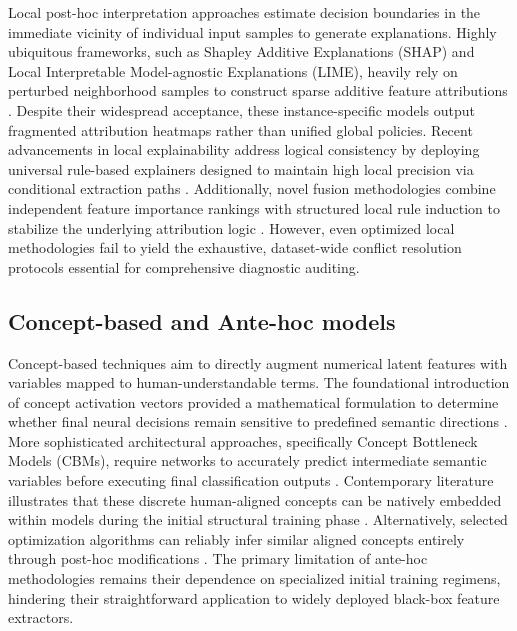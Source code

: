 \documentclass[make,article,submit,pdftex,moreauthors]{Definitions/mdpi}
\begin{document}
Local post-hoc interpretation approaches estimate decision boundaries in the immediate vicinity of individual input samples to generate explanations. Highly ubiquitous frameworks, such as Shapley Additive Explanations (SHAP) and Local Interpretable Model-agnostic Explanations (LIME), heavily rely on perturbed neighborhood samples to construct sparse additive feature attributions \cite{Salih2025SHAPLIME}. Despite their widespread acceptance, these instance-specific models output fragmented attribution heatmaps rather than unified global policies. Recent advancements in local explainability address logical consistency by deploying universal rule-based explainers designed to maintain high local precision via conditional extraction paths \cite{Bobek2025LUX}. Additionally, novel fusion methodologies combine independent feature importance rankings with structured local rule induction to stabilize the underlying attribution logic \cite{Kozielski2025RuleConsistency}. However, even optimized local methodologies fail to yield the exhaustive, dataset-wide conflict resolution protocols essential for comprehensive diagnostic auditing.

\subsection{Concept-based and Ante-hoc models}
\label{subsec:concept_explanation}

Concept-based techniques aim to directly augment numerical latent features with variables mapped to human-understandable terms. The foundational introduction of concept activation vectors provided a mathematical formulation to determine whether final neural decisions remain sensitive to predefined semantic directions \cite{Nicolson2025CAV}. More sophisticated architectural approaches, specifically Concept Bottleneck Models (CBMs), require networks to accurately predict intermediate semantic variables before executing final classification outputs \cite{Srivastava2024VLGCBM}. Contemporary literature illustrates that these discrete human-aligned concepts can be natively embedded within models during the initial structural training phase \cite{Zarlenga2022ConceptEmbedding}. Alternatively, selected optimization algorithms can reliably infer similar aligned concepts entirely through post-hoc modifications \cite{Yuksekgonul2023PostHocCBM}. The primary limitation of ante-hoc methodologies remains their dependence on specialized initial training regimens, hindering their straightforward application to widely deployed black-box feature extractors.
\end{document}
